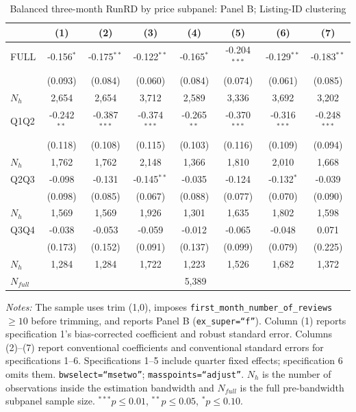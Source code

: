 \begin{table}[!htbp]
\centering
\caption{Balanced three-month RunRD by price subpanel: Panel B; Listing-ID clustering}
\scriptsize
\setlength{\tabcolsep}{5pt}
\begin{tabular}{l*{7}{c}}
\toprule
 & (1) & (2) & (3) & (4) & (5) & (6) & (7) \\
\midrule
FULL & -0.156$^{*}$ & -0.175$^{**}$ & -0.122$^{**}$ & -0.165$^{*}$ & -0.204$^{***}$ & -0.129$^{**}$ & -0.183$^{**}$ \\
 & (0.093) & (0.084) & (0.060) & (0.084) & (0.074) & (0.061) & (0.085) \\
$N_h$ & 2,654 & 2,654 & 3,712 & 2,589 & 3,336 & 3,692 & 3,202 \\
\addlinespace
Q1Q2 & -0.242$^{**}$ & -0.387$^{***}$ & -0.374$^{***}$ & -0.265$^{**}$ & -0.370$^{***}$ & -0.316$^{***}$ & -0.248$^{***}$ \\
 & (0.118) & (0.108) & (0.115) & (0.103) & (0.116) & (0.109) & (0.094) \\
$N_h$ & 1,762 & 1,762 & 2,148 & 1,366 & 1,810 & 2,010 & 1,668 \\
\addlinespace
Q2Q3 & -0.098 & -0.131 & -0.145$^{**}$ & -0.035 & -0.124 & -0.132$^{*}$ & -0.039 \\
 & (0.098) & (0.085) & (0.067) & (0.088) & (0.077) & (0.070) & (0.090) \\
$N_h$ & 1,569 & 1,569 & 1,926 & 1,301 & 1,635 & 1,802 & 1,598 \\
\addlinespace
Q3Q4 & -0.038 & -0.053 & -0.059 & -0.012 & -0.065 & -0.048 & 0.071 \\
 & (0.173) & (0.152) & (0.091) & (0.137) & (0.099) & (0.079) & (0.225) \\
$N_h$ & 1,284 & 1,284 & 1,722 & 1,223 & 1,526 & 1,682 & 1,372 \\

\midrule
$N_{full}$ & \multicolumn{7}{c}{5,389} \\
\bottomrule
\end{tabular}
\begin{minipage}{0.98\textwidth}
\footnotesize
\textit{Notes:} The sample uses trim (1,0), imposes \texttt{first\_month\_number\_of\_reviews}$\geq10$ before trimming, and reports Panel B (\texttt{ex\_super=``f''}). Column (1) reports specification 1's bias-corrected coefficient and robust standard error. Columns (2)--(7) report conventional coefficients and conventional standard errors for specifications 1--6. Specifications 1--5 include quarter fixed effects; specification 6 omits them. \texttt{bwselect=``msetwo''}; \texttt{masspoints=``adjust''}. $N_h$ is the number of observations inside the estimation bandwidth and $N_{full}$ is the full pre-bandwidth subpanel sample size. $^{***}p\leq0.01$, $^{**}p\leq0.05$, $^{*}p\leq0.10$.
\end{minipage}
\end{table}
\clearpage
